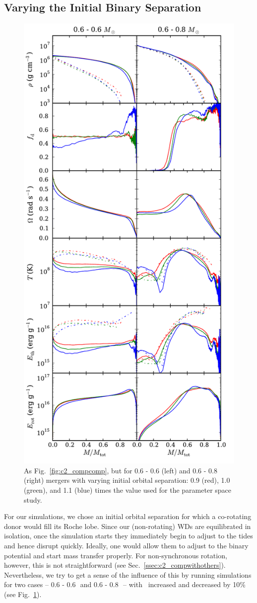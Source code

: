 \subsection{Varying the Initial Binary Separation}
\label{ssec:c2_varyingazero}

\begin{figure}
\centering
\includegraphics[angle=0,width=0.5\columnwidth]{chapter2_zhu+13/figures/distcomp.pdf}
\caption{As Fig.~\ref{fig:c2_compcomp}, but for 0.6 - 0.6 {\Msun} (left) and 0.6 - 0.8 {\Msun} (right) mergers with varying initial orbital separation: 0.9 (red), 1.0 (green), and 1.1 (blue) times the value used for the parameter space study.}
\label{fig:c2_distcomp}
\end{figure}

For our simulations, we chose an initial orbital separation {\azero} for which a co-rotating donor would fill its Roche lobe.  Since our (non-rotating) WDs are equilibrated in isolation, once the simulation starts they immediately begin to adjust to the tides and hence disrupt quickly.  Ideally, one would allow them to adjust to the binary potential and start mass transfer properly.  For non-synchronous rotation, however, this is not straightforward (see Sec.~\ref{ssec:c2_compwithothers}).  Nevertheless, we try to get a sense of the influence of this by running simulations for two cases -- 0.6 - 0.6\,\Msun\ and 0.6 - 0.8\,\Msun\ -- with \azero\ increased and decreased by 10\% (see Fig.~\ref{fig:c2_distcomp}).

